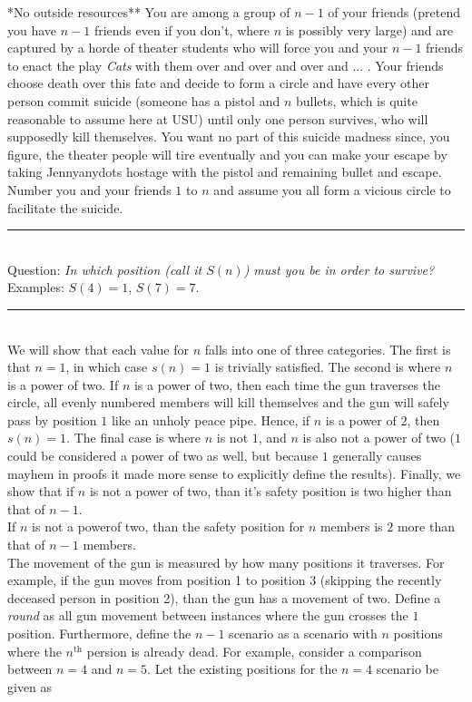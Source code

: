\documentclass{article}
\newcommand{\statementsep}{\leavevmode\\[0.005in] \rule[\baselineskip/4]{\textwidth}{0.4pt}\leavevmode\\[0.005in]}
\begin{document}
\noindent **No outside resources**  You are among a group of $n-1$  of your friends
(pretend you have $n-1$ friends even if you don't, where $n$ is possibly very 
large)
and are captured by a horde of theater students who will force you and your $n-1$ 
friends to
enact the play \emph{Cats} with them over and over and over and ... .
Your friends choose death over this fate and decide to
form a circle and have every other person commit suicide (someone has a pistol and 
$n$ bullets,
which is quite reasonable to assume here at USU) until only one person survives, 
who will
supposedly kill themselves.
You want no part of this suicide madness since, you figure, the theater people will
tire eventually and
you can make your escape by taking Jennyanydots hostage with the pistol and 
remaining bullet and escape.\\
\noindent Number you and your friends $1$ to $n$ and assume you all form a vicious 
circle to facilitate the suicide.
\statementsep
\noindent \textsf{Question:} \emph{In which position (call it $S(n)$) must you be 
in order to survive?}\\
\noindent Examples: $S(4) =1$, $S(7) =7$.
\statementsep
We will show that each value for $n$ falls into one of three categories. The first is that $n = 1$, in which case $s(n) = 1$ is trivially satisfied. The second is where $n$ is a power of two. If $n$ is a power of two, then each time the gun traverses the circle, all evenly numbered members will kill themselves and the gun will safely pass by position $1$ like an unholy peace pipe. Hence, if $n$ is a power of $2$, then $s(n) = 1$. The final case is where $n$ is not $1$, and $n$ is also not a power of two ($1$ could be considered a power of two as well, but because $1$ generally causes mayhem in proofs it made more sense to explicitly define the results). Finally, we show that if $n$ is not a power of two, than it's safety position is two higher than that of $n - 1$.
\\  If $n$ is not a powerof two, than the safety position for $n$ members is $2$ more than that of $n - 1$ members.
\\  The movement of the gun is measured by how many positions it traverses. For example, if the gun moves from position 1 to position 3 (skipping the recently deceased person in position 2), than the gun has a movement of two. Define a {\it round} as all gun movement between instances where the gun crosses the $1$ position. Furthermore, define the $n - 1$ scenario as a scenario with $n$ positions where the $n^{\text{th}}$ persion is already dead. For example, consider a comparison between $n = 4$ and $n = 5$. Let the existing positions for the $n = 4$ scenario be given as 
\end{document}
